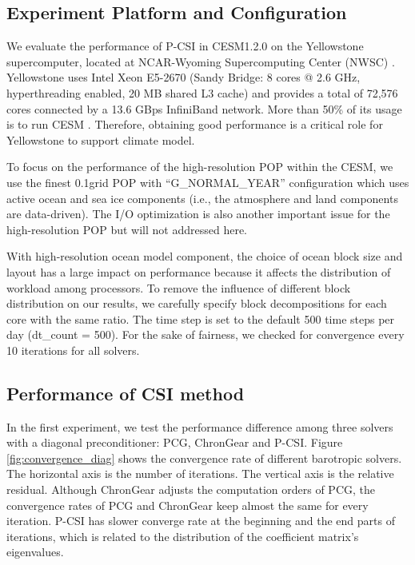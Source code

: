 \subsection{Experiment Platform and Configuration}
We evaluate the performance of P-CSI in CESM1.2.0 on the Yellowstone supercomputer, located at NCAR-Wyoming Supercomputing Center (NWSC) \citep{loft:2015}. Yellowstone uses  Intel Xeon E5-2670 (Sandy Bridge: 8 cores @ 2.6 GHz, hyperthreading enabled, 20 MB shared L3 cache) and provides a total of 72,576 cores connected by a 13.6 GBps InfiniBand network. More than 50\% of its usage is to run CESM \citep{wf2014}. Therefore, obtaining good performance is a critical role for Yellowstone to support climate model.

To focus on the performance of the high-resolution POP within the CESM, we use the finest 0.1\degree\space grid POP with ``G\_NORMAL\_YEAR'' configuration which uses active ocean and sea ice components (i.e., the atmosphere and land components are data-driven).
The I/O optimization is also another important issue for the high-resolution POP \citep{huang2014fast} but will not addressed here.

With high-resolution ocean model component, the choice of ocean block size and layout has a large impact on performance because it affects the distribution of workload among processors.
To remove the influence of different block distribution on our results, we carefully specify block decompositions for each core with the same ratio.  The time step is set to the default 500 time steps per day (dt\_count = 500). For the sake of fairness, we checked for convergence every 10 iterations for all solvers.

\subsection{Performance of CSI method}
In the first experiment, we  test the performance difference among three solvers with a diagonal preconditioner: PCG, ChronGear and  P-CSI. Figure \ref{fig:convergence_diag} shows the convergence rate of different barotropic solvers. The horizontal axis is the number of iterations. The vertical axis is the relative residual. Although ChronGear adjusts the computation orders of PCG, the convergence rates of PCG and ChronGear keep almost the same for every iteration.
P-CSI has slower converge rate at the beginning and the end parts of iterations, which is related to the distribution of the coefficient matrix's eigenvalues.

